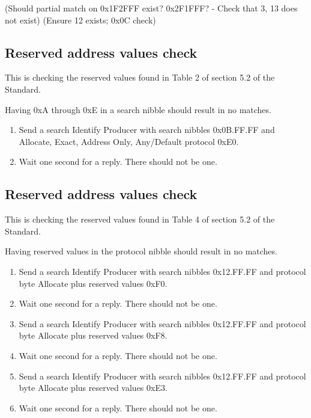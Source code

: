 (Should partial match on 0x1F2FFF exist?  0x2F1FFF? - Check that 3, 13 does not exist)
(Ensure 12 exists; 0x0C check)

\subsection{Reserved address values check}

This is checking the reserved values found in Table 2 of section 5.2 of the Standard.

Having 0xA through 0xE in a search nibble should result in no matches.

\begin{enumerate}

\item Send a search Identify Producer with search nibbles 0x0B.FF.FF and 
    Allocate, Exact, Address Only, Any/Default protocol 0xE0.

\item Wait one second for a reply.  There should not be one.

\end{enumerate}

\subsection{Reserved address values check}

This is checking the reserved values found in Table 4 of section 5.2 of the Standard.

Having reserved values in the protocol nibble should result in no matches.

\begin{enumerate}

\item Send a search Identify Producer with search nibbles 0x12.FF.FF and 
    protocol byte Allocate plus reserved values 0xF0.

\item Wait one second for a reply.  There should not be one.

\item Send a search Identify Producer with search nibbles 0x12.FF.FF and 
    protocol byte Allocate plus reserved values 0xF8.

\item Wait one second for a reply.  There should not be one.

\item Send a search Identify Producer with search nibbles 0x12.FF.FF and 
    protocol byte Allocate plus reserved values 0xE3.

\item Wait one second for a reply.  There should not be one.

\end{enumerate}

  

